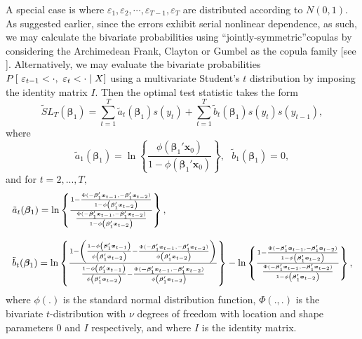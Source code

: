\documentclass[harvard,11pt]{article}
\begin{document}
 A special case is where $\varepsilon_1,\varepsilon_2,\cdots,\varepsilon_{T-1},\varepsilon_T$ are distributed according to $N(0,1)$. As suggested earlier, since the errors exhibit serial nonlinear dependence, as such, we may calculate the bivariate probabilities using \textquotedblleft jointly-symmetric\textquotedblright copulas by considering the Archimedean Frank, Clayton or Gumbel as the copula family [see \citet{joe2014dependence}]. Alternatively, we may evaluate the bivariate probabilities $P\left[ \text{ }\varepsilon_{t-1}<\cdot ,\-
\text{ }\varepsilon_{t}<\cdot \mid X\right]$ using a multivariate Student's $t$ distribution by imposing the identity matrix $I$.
 Then the optimal test statistic takes the form 
\begin{equation*}
\tilde{S}L_{T}(\bm{\beta}_{1})=\sum\limits_{t=1}^{T}\tilde{a}_{t}(\bm{\beta}_{1})%
s(y_{t})+\sum\limits_{t=1}^{T}\tilde{b}_{t}(\bm{\beta}_{1})%
s(y_{t})s(y_{t-1}),
\end{equation*}%
where%
\begin{equation*}
\tilde{a}_{1}(\bm{\beta}_{1})=\ln \left\{ \frac{\phi(\bm{\beta}_1'\bm{x}_0) }{1-\phi(\bm{\beta}_1'\bm{x}_0)}\right\} ,\text{ }\tilde{b}_{1}(\bm{\beta}_{1})=0,
\end{equation*}%
and for $t=2,...,T,$%
\begin{equation*}
\begin{tabular}{l}
$\tilde{a}_{t}(\bm{\beta} _{1})=\ln \left\{ \frac{1-\frac{\Phi(-\bm{\beta}_1'\bm{x}_{t-1},-\bm{\beta}_1'\bm{x}_{t-2}) }{1-\phi\left(\bm{\beta}_1'\bm{x}_{t-2}\right)}}{\frac{\Phi(-\bm{\beta}_1'\bm{x}_{t-1},-\bm{\beta}_1'\bm{x}_{t-2}) }{1-\phi\left(\bm{\beta}_1'\bm{x}_{t-2}\right)}}\right\}, $ \\ 
\\ 
$\tilde{b}_{t}(\bm{\beta}_{1})=\ln \left\{ \frac{1-\left( \frac{1-\phi\left(\bm{\beta}_1'\bm{x}_{t-1}\right) }{\phi\left(\bm{\beta}_1'\bm{x}_{t-2}\right) }-\frac{\Phi(-\bm{\beta}_1'\bm{x}_{t-1},-\bm{\beta}_1'\bm{x}_{t-2}) }{\phi\left(\bm{\beta}_1'\bm{x}_{t-2}\right) }\right) }{\frac{1-\phi\left(\bm{\beta}_1'\bm{x}_{t-1}\right)}{\phi\left(\bm{\beta}_1'\bm{x}_{t-2}\right) }-\frac{\Phi(\bm{-\beta}_1'\bm{x}_{t-1},-\bm{\beta}_1'\bm{x}_{t-2}) }{\phi\left(\bm{\beta}_1'\bm{x}_{t-2}\right)}}\right\} -\ln \left\{ \frac{1-\frac{\Phi(-\bm{\beta}_1'\bm{x}_{t-1},-\bm{\beta}_1'\bm{x}_{t-2}) }{1-\phi\left(\bm{\beta}_1'\bm{x}_{t-2}\right) }}{\frac{\Phi(-\bm{\beta}_1'\bm{x}_{t-1},-\bm{\beta}_1'\bm{x}_{t-2})}{1-\phi\left(\bm{\beta}_1'\bm{x}_{t-2}\right)}}\right\}, $%
\end{tabular}%
\end{equation*}%
where $\phi(.)$ is the standard normal distribution function, $\Phi(.,.)$ is the bivariate $t$-distribution with $\nu$ degrees of freedom with location and shape parameters $0$ and $I$ respectively, and where $I$ is the identity matrix.
\end{document}
